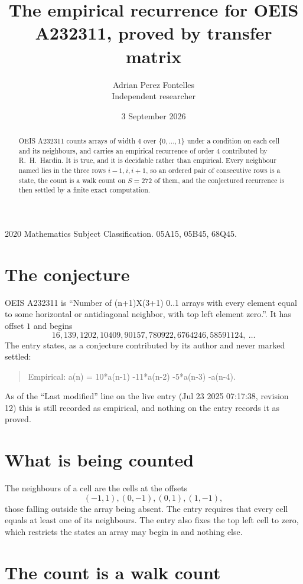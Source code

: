 \documentclass[11pt,a4paper]{article}
\title{The empirical recurrence for OEIS A232311, proved by transfer matrix}
\author{Adrian Perez Fontelles\\ \small Independent researcher}
\date{3 September 2026}
\theoremstyle{plain}
\theoremstyle{definition}
\begin{document}
\maketitle

\begin{abstract}
OEIS A232311 counts arrays of width $4$ over $\{0,\dots,1\}$ under a condition on each cell
and its neighbours, and carries an empirical recurrence of order $4$ contributed by
R.~H.~Hardin. It is true, and it is decidable rather than empirical. Every neighbour named lies
in the three rows $i-1,i,i+1$, so an ordered pair of consecutive rows is a state, the count is
a walk count on $S=272$ of them, and the conjectured recurrence is then settled by a finite
exact computation.
\end{abstract}

\noindent\small 2020 Mathematics Subject Classification. 05A15, 05B45, 68Q45.\normalsize

\section{The conjecture}

OEIS A232311 is ``Number of (n+1)X(3+1) 0..1 arrays with every element equal to some horizontal or antidiagonal neighbor, with top left element zero.''. It has offset $1$ and begins
\[
16, 139, 1202, 10409, 90157, 780922, 6764246, 58591124,\ \dots
\]
The entry states, as a conjecture contributed by its author and never marked settled:
\begin{quote}
Empirical: a(n) = 10*a(n-1) -11*a(n-2) -5*a(n-3) -a(n-4).
\end{quote}
As of the ``Last modified'' line on the live entry (Jul 23 2025 07:17:38, revision 12) this is still
recorded as empirical, and nothing on the entry records it as proved.

\section{What is being counted}

The neighbours of a cell are the cells at the offsets
\[
(-1,1), (0,-1), (0,1), (1,-1),
\]
those falling outside the array being absent. The entry requires that every cell equals at least one of its neighbours. The entry also fixes the top left cell to zero, which restricts the states an array may begin in and nothing else.

\section{The count is a walk count}
\end{document}

